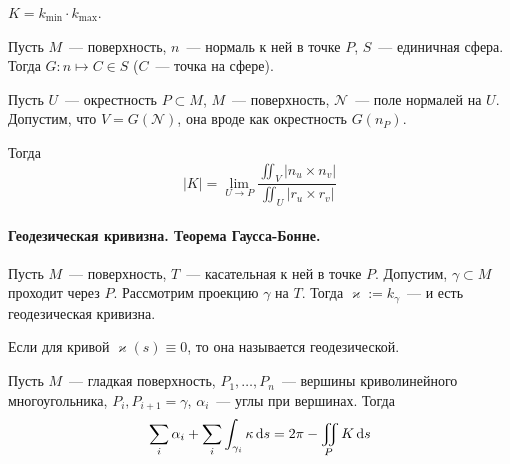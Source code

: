 \documentclass[12pt,timbord]{longnotes}
\begin{document}
\begin{defn}\label{defn:meas::gauss::crvf}
  $K = k_{\min} \cdot k_{\max}$.
\end{defn}

\begin{defn}\label{defn:meas::gauss::map}
  Пусть $M$~--- поверхность, $n$~--- нормаль к ней в точке $P$, $S$~--- единичная сфера.
  Тогда $G: n \mapsto C \in S$ ($C$~--- точка на сфере).
\end{defn}

\begin{thrm}\label{thrm:meas::gauss::lim}
  Пусть $U$~--- окрестность $P \subset M$, $M$~--- поверхность, $\mathcal N$~--- поле нормалей
  на $U$. Допустим, что $V = G(\mathcal N)$, она вроде как окрестность $G(n_P)$. 

  Тогда \[
    |K| = \lim_{U \to P} \frac{\iint_V |n_u \times n_v|}{\iint_U|r_u \times r_v|} 
  \]
\end{thrm}

\paragraph{Геодезическая кривизна. Теорема Гаусса-Бонне.}
\label{par:meas::bonnet}

\begin{defn}\label{defn:meas::bonnet::geodcurv}
  Пусть $M$~--- поверхность, $T$~--- касательная к ней в точке $P$. Допустим,
  $\gamma \subset M$ проходит через $P$. Рассмотрим проекцию $\gamma$ на $T$.
  Тогда $\varkappa := k_\gamma $~--- и есть геодезическая кривизна.
\end{defn}

\begin{defn}\label{defn:meas::bonnet::geodcurv}
  Если для кривой $\varkappa(s) \equiv 0$, то она называется геодезической.
\end{defn}

\begin{thrm}\label{thrm:meas::bonnet}
  Пусть $M$~--- гладкая поверхность, $P_1, \dotsc, P_n$~--- вершины криволинейного многоугольника,
  $P_i, P_{i+1} = \gamma $, $\alpha_i$~--- углы при вершинах. Тогда \[
    \sum_i \alpha_i + \sum_i \int _{\gamma_i} \kappa \, \mathrm{d} s  = 2 \pi - \iint_P K \, \mathrm{d} s
  \]
\end{thrm}
\end{document}
